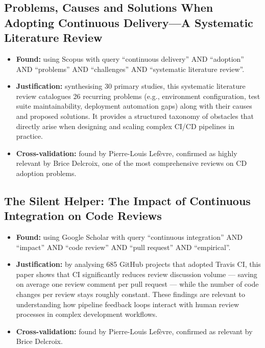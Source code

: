 \documentclass[a4paper,11pt,oneside]{article}
\begin{document}
\subsection{Problems, Causes and Solutions When Adopting Continuous Delivery---A Systematic Literature Review \cite{Laukkanen2017}}
%
\begin{itemize}
    \item \textbf{Found:} using Scopus with query ``continuous delivery'' AND ``adoption'' AND ``problems'' AND ``challenges'' AND ``systematic literature review''.
    \item \textbf{Justification:} synthesising 30 primary studies, this systematic literature review catalogues 26 recurring problems (e.g., environment configuration, test suite maintainability, deployment automation gaps) along with their causes and proposed solutions. It provides a structured taxonomy of obstacles that directly arise when designing and scaling complex CI/CD pipelines in practice.
    \item \textbf{Cross-validation:} found by Pierre-Louis Lef\`{e}vre, confirmed as highly relevant by Brice Delcroix, one of the most comprehensive reviews on CD adoption problems.
\end{itemize}

\subsection{The Silent Helper: The Impact of Continuous Integration on Code Reviews \cite{Cassee2020}}
%
\begin{itemize}
    \item \textbf{Found:} using Google Scholar with query ``continuous integration'' AND ``impact'' AND ``code review'' AND ``pull request'' AND ``empirical''.
    \item \textbf{Justification:} by analysing 685 GitHub projects that adopted Travis CI, this paper shows that CI significantly reduces review discussion volume --- saving on average one review comment per pull request --- while the number of code changes per review stays roughly constant. These findings are relevant to understanding how pipeline feedback loops interact with human review processes in complex development workflows.
    \item \textbf{Cross-validation:} found by Pierre-Louis Lef\`{e}vre, confirmed as relevant by Brice Delcroix.
\end{itemize}

\end{document}
